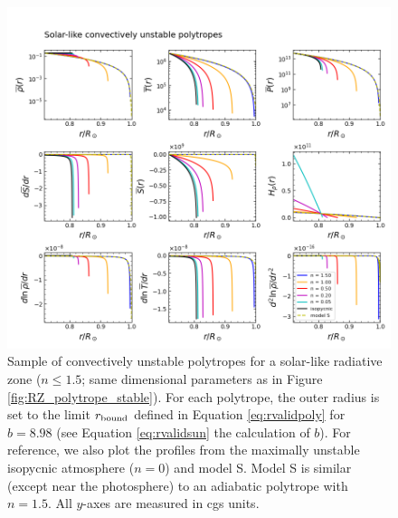 \documentclass[12pt]{article}
\numberwithin{equation}{section}
\begin{document}
\begin{figure}
	\includegraphics[width=6.5in]{figures/solar_CZ_polytropes_unstable.png}
	\caption{Sample of convectively unstable polytropes for a solar-like radiative zone ($n\leq1.5$; same dimensional parameters as in Figure \ref{fig:RZ_polytrope_stable}). For each polytrope, the outer radius is set to the limit $r_{\rm{bound}}$ defined in Equation \eqref{eq:rvalidpoly} for $b=8.98$ (see Equation \eqref{eq:rvalidsun} the calculation of $b$). For reference, we also plot the profiles from the maximally unstable isopycnic atmosphere ($n=0$) and model S. Model S is similar (except near the photosphere) to an adiabatic polytrope with $n=1.5$. All $y$-axes are measured in cgs units.}
	\label{fig:CZ_polytrope_unstable}
\end{figure}



\end{document}
